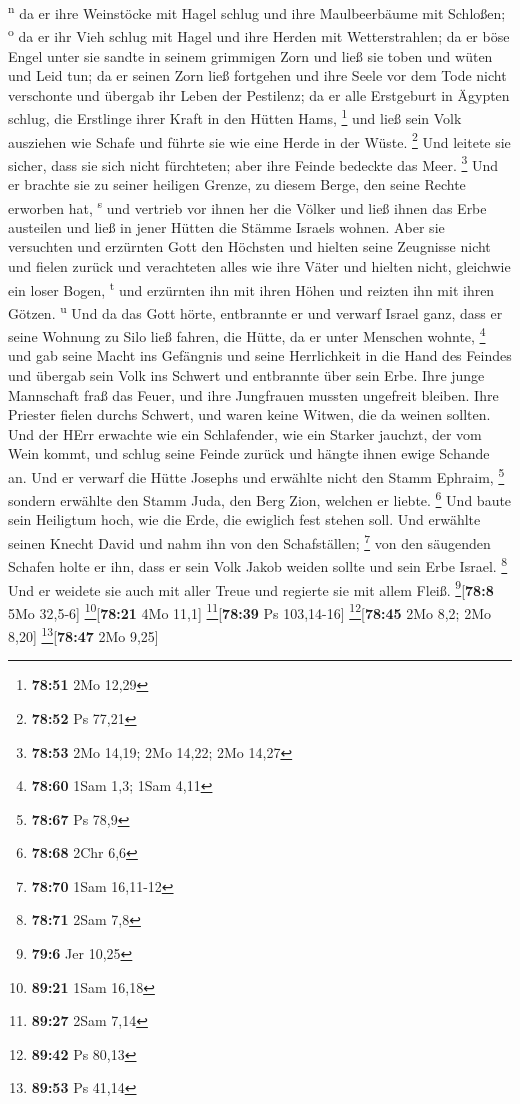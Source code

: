 \textsuperscript{n}  da er ihre Weinstöcke mit Hagel
schlug und ihre Maulbeerbäume mit Schloßen; \textsuperscript{o}
 da er ihr Vieh schlug mit Hagel und ihre Herden mit
Wetterstrahlen;  da er böse Engel unter sie sandte in
seinem grimmigen Zorn und ließ sie toben und wüten und Leid tun;
 da er seinen Zorn ließ fortgehen und ihre Seele vor dem
Tode nicht verschonte und übergab ihr Leben der Pestilenz;
 da er alle Erstgeburt in Ägypten schlug, die Erstlinge
ihrer Kraft in den Hütten Hams, \footnote{\textbf{78:51} 2Mo 12,29}
 und ließ sein Volk ausziehen wie Schafe und führte sie
wie eine Herde in der Wüste. \footnote{\textbf{78:52} Ps 77,21}
 Und leitete sie sicher, dass sie sich nicht fürchteten;
aber ihre Feinde bedeckte das Meer. \footnote{\textbf{78:53} 2Mo 14,19;
  2Mo 14,22; 2Mo 14,27}  Und er brachte sie zu seiner
heiligen Grenze, zu diesem Berge, den seine Rechte erworben hat,
\textsuperscript{s}  und vertrieb vor ihnen her die
Völker und ließ ihnen das Erbe austeilen und ließ in jener Hütten die
Stämme Israels wohnen.  Aber sie versuchten und erzürnten
Gott den Höchsten und hielten seine Zeugnisse nicht  und
fielen zurück und verachteten alles wie ihre Väter und hielten nicht,
gleichwie ein loser Bogen, \textsuperscript{t}  und
erzürnten ihn mit ihren Höhen und reizten ihn mit ihren Götzen.
\textsuperscript{u}  Und da das Gott hörte, entbrannte er
und verwarf Israel ganz,  dass er seine Wohnung zu Silo
ließ fahren, die Hütte, da er unter Menschen wohnte, \footnote{\textbf{78:60}
  1Sam 1,3; 1Sam 4,11}  und gab seine Macht ins Gefängnis
und seine Herrlichkeit in die Hand des Feindes  und
übergab sein Volk ins Schwert und entbrannte über sein Erbe.
 Ihre junge Mannschaft fraß das Feuer, und ihre
Jungfrauen mussten ungefreit bleiben.  Ihre Priester
fielen durchs Schwert, und waren keine Witwen, die da weinen sollten.
 Und der HErr erwachte wie ein Schlafender, wie ein
Starker jauchzt, der vom Wein kommt,  und schlug seine
Feinde zurück und hängte ihnen ewige Schande an.  Und er
verwarf die Hütte Josephs und erwählte nicht den Stamm Ephraim,
\footnote{\textbf{78:67} Ps 78,9}  sondern erwählte den
Stamm Juda, den Berg Zion, welchen er liebte. \footnote{\textbf{78:68}
  2Chr 6,6}  Und baute sein Heiligtum hoch, wie die Erde,
die ewiglich fest stehen soll.  Und erwählte seinen
Knecht David und nahm ihn von den Schafställen; \footnote{\textbf{78:70}
  1Sam 16,11-12}  von den säugenden Schafen holte er ihn,
dass er sein Volk Jakob weiden sollte und sein Erbe Israel. \footnote{\textbf{78:71}
  2Sam 7,8}  Und er weidete sie auch mit aller Treue und
regierte sie mit allem Fleiß. \footnote{\textbf{79:6} Jer 10,25}{[}\textbf{78:8}
5Mo 32,5-6{]} \footnote{\textbf{89:21} 1Sam 16,18}{[}\textbf{78:21} 4Mo
11,1{]} \footnote{\textbf{89:27} 2Sam 7,14}{[}\textbf{78:39} Ps
103,14-16{]} \footnote{\textbf{89:42} Ps 80,13}{[}\textbf{78:45} 2Mo
8,2; 2Mo 8,20{]} \footnote{\textbf{89:53} Ps 41,14}{[}\textbf{78:47} 2Mo
9,25{]}

